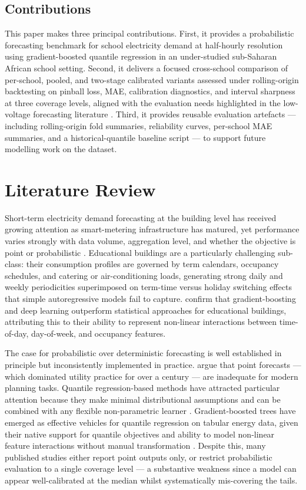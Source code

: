 \documentclass[12pt,a4paper]{article}
\begin{document}
\subsection*{Contributions}

This paper makes three principal contributions. First, it provides a probabilistic forecasting benchmark for school electricity demand at half-hourly resolution using gradient-boosted quantile regression in an under-studied sub-Saharan African school setting. Second, it delivers a focused cross-school comparison of per-school, pooled, and two-stage calibrated variants assessed under rolling-origin backtesting on pinball loss, MAE, calibration diagnostics, and interval sharpness at three coverage levels, aligned with the evaluation needs highlighted in the low-voltage forecasting literature \citep{haben2021}. Third, it provides reusable evaluation artefacts --- including rolling-origin fold summaries, reliability curves, per-school MAE summaries, and a historical-quantile baseline script --- to support future modelling work on the dataset.

\section{Literature Review}

Short-term electricity demand forecasting at the building level has received growing attention as smart-metering infrastructure has matured, yet performance varies strongly with data volume, aggregation level, and whether the objective is point or probabilistic \citep{haben2021}. Educational buildings are a particularly challenging sub-class: their consumption profiles are governed by term calendars, occupancy schedules, and catering or air-conditioning loads, generating strong daily and weekly periodicities superimposed on term-time versus holiday switching effects that simple autoregressive models fail to capture. \citet{elhabyb2024} confirm that gradient-boosting and deep learning outperform statistical approaches for educational buildings, attributing this to their ability to represent non-linear interactions between time-of-day, day-of-week, and occupancy features.

The case for probabilistic over deterministic forecasting is well established in principle but inconsistently implemented in practice. \citet{hongfan2016} argue that point forecasts --- which dominated utility practice for over a century --- are inadequate for modern planning tasks. Quantile regression-based methods have attracted particular attention because they make minimal distributional assumptions and can be combined with any flexible non-parametric learner \citep{koenker1978}. Gradient-boosted trees have emerged as effective vehicles for quantile regression on tabular energy data, given their native support for quantile objectives and ability to model non-linear feature interactions without manual transformation \citep{friedman2001, ke2017}. Despite this, many published studies either report point outputs only, or restrict probabilistic evaluation to a single coverage level --- a substantive weakness since a model can appear well-calibrated at the median whilst systematically mis-covering the tails.
\end{document}
